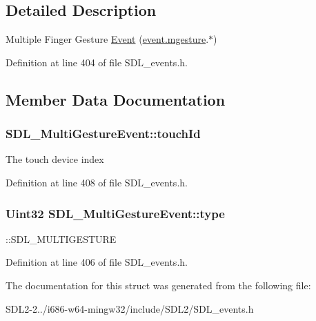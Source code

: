\subsection{Detailed Description}
Multiple Finger Gesture \hyperlink{classEvent}{Event} (\hyperlink{unionSDL__Event_ac19b3c6a6b5181a51eb4fbe2cbe726a9}{event.\+mgesture}.$\ast$) 

Definition at line 404 of file S\+D\+L\+\_\+events.\+h.



\subsection{Member Data Documentation}
\hypertarget{structSDL__MultiGestureEvent_aa15d1201559a3c9277082af71a972dc1}{
\subsubsection[{touch\+Id}]{ S\+D\+L\+\_\+\+Multi\+Gesture\+Event\+::touch\+Id}}\label{structSDL__MultiGestureEvent_aa15d1201559a3c9277082af71a972dc1}
The touch device index 

Definition at line 408 of file S\+D\+L\+\_\+events.\+h.

\hypertarget{structSDL__MultiGestureEvent_ab0c7adc9a3f71cc3532bfe0ff8cc6120}{
\subsubsection[{type}]{\setlength{\rightskip}{0pt plus 5cm}Uint32 S\+D\+L\+\_\+\+Multi\+Gesture\+Event\+::type}}\label{structSDL__MultiGestureEvent_ab0c7adc9a3f71cc3532bfe0ff8cc6120}
\+::\+S\+D\+L\+\_\+\+M\+U\+L\+T\+I\+G\+E\+S\+T\+U\+R\+E 

Definition at line 406 of file S\+D\+L\+\_\+events.\+h.



The documentation for this struct was generated from the following file\+:\begin{DoxyCompactItemize}
\item 
S\+D\+L2-\/2../i686-\/w64-\/mingw32/include/\+S\+D\+L2/S\+D\+L\+\_\+events.\+h\end{DoxyCompactItemize}
